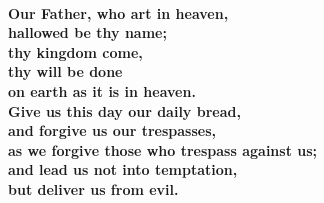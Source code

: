 \vspace{\baselineskip}
\vspace{4mm}


\\

\textbf{Our Father, who art in heaven,\\
hallowed be thy name;\\
thy kingdom come,\\
thy will be done\\
on earth as it is in heaven.\\
Give us this day our daily bread,\\
and forgive us our trespasses,\\
as we forgive those who trespass against us;\\
and lead us not into temptation,\\
but deliver us from evil.}

\vspace{10mm}


